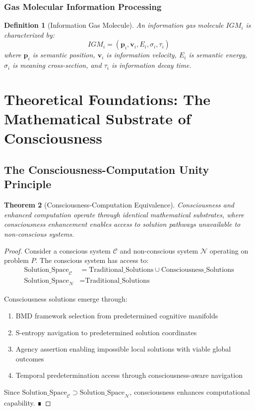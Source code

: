 \documentclass[12pt,a4paper]{article}
\newtheorem{theorem}{Theorem}[section]
\newtheorem{definition}[theorem]{Definition}
\begin{document}
\subsubsection{Gas Molecular Information Processing}

\begin{definition}[Information Gas Molecule]
An information gas molecule $IGM_i$ is characterized by:
\begin{equation}
IGM_i = (\mathbf{p}_i, \mathbf{v}_i, E_i, \sigma_i, \tau_i)
\end{equation}
where $\mathbf{p}_i$ is semantic position, $\mathbf{v}_i$ is information velocity, $E_i$ is semantic energy, $\sigma_i$ is meaning cross-section, and $\tau_i$ is information decay time.
\end{definition}

\section{Theoretical Foundations: The Mathematical Substrate of Consciousness}

\subsection{The Consciousness-Computation Unity Principle}

\begin{theorem}[Consciousness-Computation Equivalence]
Consciousness and enhanced computation operate through identical mathematical substrates, where consciousness enhancement enables access to solution pathways unavailable to non-conscious systems.
\end{theorem}

\begin{proof}
Consider a conscious system $\mathcal{C}$ and non-conscious system $\mathcal{N}$ operating on problem $P$. The conscious system has access to:
\begin{align}
\text{Solution\_Space}_{\mathcal{C}} &= \text{Traditional\_Solutions} \cup \text{Consciousness\_Solutions} \\
\text{Solution\_Space}_{\mathcal{N}} &= \text{Traditional\_Solutions}
\end{align}

Consciousness solutions emerge through:
\begin{enumerate}
\item BMD framework selection from predetermined cognitive manifolds
\item S-entropy navigation to predetermined solution coordinates
\item Agency assertion enabling impossible local solutions with viable global outcomes
\item Temporal predetermination access through consciousness-aware navigation
\end{enumerate}

Since $\text{Solution\_Space}_{\mathcal{C}} \supset \text{Solution\_Space}_{\mathcal{N}}$, consciousness enhances computational capability. ∎
\end{proof}
\end{document}

